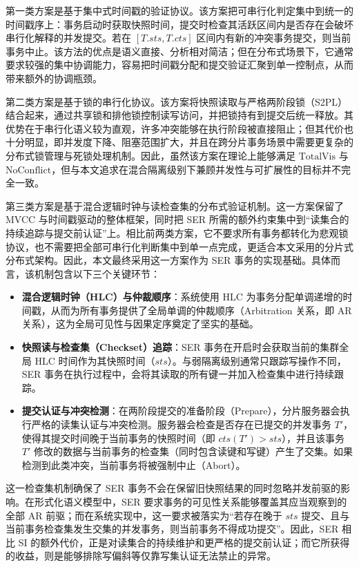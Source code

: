 第一类方案是基于集中式时间戳的验证协议\cite{peng2010large}。该方案把可串行化判定集中到统一的时间戳序上：事务启动时获取快照时间，提交时检查其活跃区间内是否存在会破坏串行化解释的并发提交。若在 $[T.sts, T.cts]$ 区间内有新的冲突事务提交，则当前事务中止。该方法的优点是语义直接、分析相对简洁；但在分布式场景下，它通常要求较强的集中协调能力，容易把时间戳分配和提交验证汇聚到单一控制点，从而带来额外的协调瓶颈。

第二类方案是基于锁的串行化协议\cite{eswaran1976notions}。该方案将快照读取与严格两阶段锁（S2PL）结合起来，通过共享锁和排他锁控制读写访问，并把锁持有到提交后统一释放。其优势在于串行化语义较为直观，许多冲突能够在执行阶段被直接阻止；但其代价也十分明显，即并发度下降、阻塞范围扩大，并且在跨分片事务场景中需要更复杂的分布式锁管理与死锁处理机制。因此，虽然该方案在理论上能够满足 $\text{TotalVis}$ 与 $\text{NoConflict}$，但与本文追求在混合隔离级别下兼顾并发性与可扩展性的目标并不完全一致。

第三类方案是基于混合逻辑时钟与读检查集的分布式验证机制\cite{kulkarni2014logical}。这一方案保留了 MVCC 与时间戳驱动的整体框架，同时把 SER 所需的额外约束集中到“读集合的持续追踪与提交前认证”上。相比前两类方案，它不要求所有事务都转化为悲观锁协议，也不需要把全部可串行化判断集中到单一点完成，更适合本文采用的分片式分布式架构。因此，本文最终采用这一方案作为 SER 事务的实现基础。具体而言，该机制包含以下三个关键环节：
\begin{itemize}
  \item \textbf{混合逻辑时钟（HLC）与仲裁顺序}：系统使用 HLC 为事务分配单调递增的时间戳，从而为所有事务提供了全局单调的仲裁顺序（Arbitration 关系，即 AR 关系），这为全局可见性与因果定序奠定了坚实的基础。
  \item \textbf{快照读与检查集（Checkset）追踪}：SER 事务在开启时会获取当前的集群全局 HLC 时间作为其快照时间（$sts$）。与弱隔离级别通常只跟踪写操作不同，SER 事务在执行过程中，会将其读取的所有键一并加入检查集中进行持续跟踪。
  \item \textbf{提交认证与冲突检测}：在两阶段提交的准备阶段（Prepare），分片服务器会执行严格的读集认证与冲突检测。服务器会检查是否存在已提交的并发事务 $T'$，使得其提交时间晚于当前事务的快照时间（即 $cts(T') > sts$），并且该事务 $T'$ 修改的数据与当前事务的检查集（同时包含读键和写键）产生了交集。如果检测到此类冲突，当前事务将被强制中止（Abort）。
\end{itemize}

这一检查集机制确保了 SER 事务不会在保留旧快照结果的同时忽略并发前驱的影响。在形式化语义模型中，SER 要求事务的可见性关系能够覆盖其应当观察到的全部 AR 前驱；而在系统实现中，这一要求被落实为“若存在晚于 $sts$ 提交、且与当前事务检查集发生交集的并发事务，则当前事务不得成功提交”。因此，SER 相比 SI 的额外代价，正是对读集合的持续维护和更严格的提交前认证；而它所获得的收益，则是能够排除写偏斜等仅靠写集认证无法禁止的异常。

